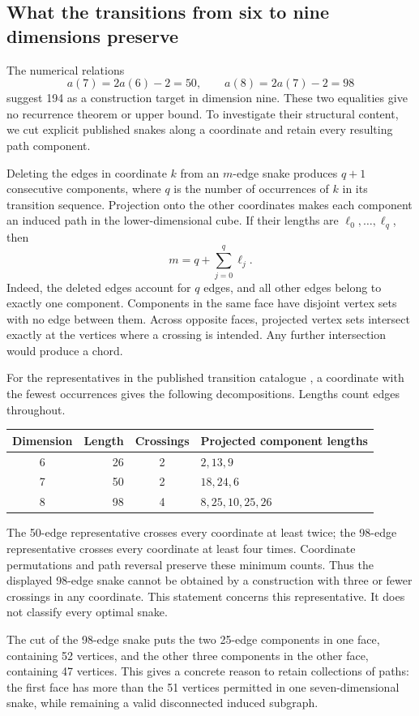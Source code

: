 \documentclass[11pt,a4paper]{article}
\theoremstyle{definition}
\theoremstyle{remark}
\begin{document}
\subsection{What the transitions from six to nine dimensions preserve}
\label{sec:dimensional-constructions}
The numerical relations
\[
a(7)=2a(6)-2=50,\qquad a(8)=2a(7)-2=98
\]
suggest 194 as a construction target in dimension nine. These two
equalities give no recurrence theorem or upper bound. To investigate
their structural content, we cut explicit published snakes along a
coordinate and retain every resulting path component.

Deleting the edges in coordinate $k$ from an $m$-edge snake produces
$q+1$ consecutive components, where $q$ is the number of occurrences
of $k$ in its transition sequence. Projection onto the other coordinates
makes each component an induced path in the lower-dimensional cube.
If their lengths are $\ell_0,\ldots,\ell_q$, then
\[
m=q+\sum_{j=0}^{q}\ell_j.
\]
Indeed, the deleted edges account for $q$ edges, and all other edges
belong to exactly one component. Components in the same face have
disjoint vertex sets with no edge between them. Across opposite faces,
projected vertex sets intersect exactly at the vertices where a crossing
is intended. Any further intersection would produce a chord.

For the representatives in the published transition catalogue
\cite{records}, a coordinate with the fewest occurrences gives the
following decompositions. Lengths count edges throughout.
\begin{center}
\begin{tabular}{crcl}
\toprule
Dimension & Length & Crossings & Projected component lengths\\
\midrule
6 & 26 & 2 & $2,13,9$\\
7 & 50 & 2 & $18,24,6$\\
8 & 98 & 4 & $8,25,10,25,26$\\
\bottomrule
\end{tabular}
\end{center}
The 50-edge representative crosses every coordinate at least twice;
the 98-edge representative crosses every coordinate at least four
times. Coordinate permutations and path reversal preserve these
minimum counts. Thus the displayed 98-edge snake cannot be obtained
by a construction with three or fewer crossings in any coordinate.
This statement concerns this representative. It does not classify
every optimal snake.

The cut of the 98-edge snake puts the two 25-edge components in one
face, containing 52 vertices, and the other three components in the
other face, containing 47 vertices. This gives a concrete reason to
retain collections of paths: the first face has more than the 51
vertices permitted in one seven-dimensional snake, while remaining
a valid disconnected induced subgraph.
\end{document}
